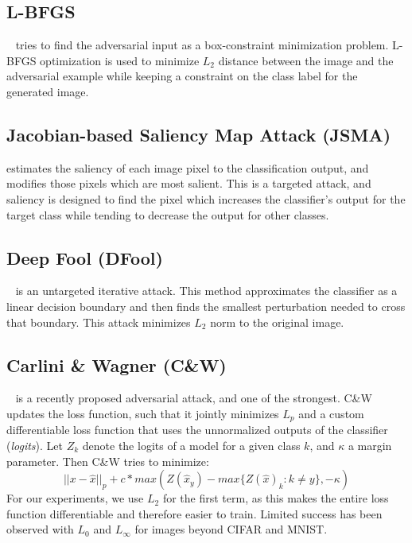 \subsection{L-BFGS} ~\cite{Szegedy2013IntriguingPO} tries to find the adversarial input as a box-constraint minimization problem.
L-BFGS optimization is used to minimize $L_2$ distance between the image and the adversarial example while keeping a constraint on the class label for the generated image.


\subsection{Jacobian-based Saliency Map Attack (JSMA)} 
\cite{papernot2016limitations} estimates the saliency of each image pixel \wrt to the classification output, and modifies those pixels which are most salient. This is a targeted attack, and saliency is designed to find the pixel which increases the classifier's output for the target class while tending to decrease the output for other classes.

\subsection{Deep Fool (DFool)}
 ~\cite{MoosaviDezfooli2016DeepFoolAS} is an untargeted iterative attack. 
This method approximates the classifier as a linear decision boundary and then finds the smallest perturbation needed to cross that boundary.
This attack minimizes $L_2$ norm \wrt to the original image. 

\subsection{Carlini \& Wagner (C\&W)}
 ~\cite{Carlini2017TowardsET} is a recently proposed adversarial attack, and one of the strongest.
C\&W updates the loss function, such that it jointly minimizes $L_p$ and a custom differentiable loss function that uses the unnormalized outputs of the classifier (\textit{logits}). 
Let $Z_k$ denote the logits of a model for a given class $k$, and $\kappa$ a margin parameter. Then C\&W tries to minimize:
\begin{equation}
|| x - \hat{x} ||_p + c* max\left(Z(\hat{x}_y) - max\{Z(\hat{x})_k : k \neq y\},-\kappa\right)
\end{equation}
For our experiments, we use $L_2$ for the first term, as this makes the entire loss function differentiable and therefore easier to train. 
Limited success has been observed with $L_0$ and $L_\infty$ for images beyond CIFAR and MNIST.

